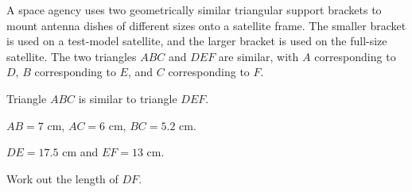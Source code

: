 \begin{question}
\noindent A space agency uses two geometrically similar triangular support brackets to mount antenna dishes of different sizes onto a satellite frame. The smaller bracket is used on a test-model satellite, and the larger bracket is used on the full-size satellite. The two triangles $ABC$ and $DEF$ are similar, with $A$ corresponding to $D$, $B$ corresponding to $E$, and $C$ corresponding to $F$.

\begin{center}
\end{center}

\noindent Triangle $ABC$ is similar to triangle $DEF$.

\noindent $AB = 7$ cm, $AC = 6$ cm, $BC = 5.2$ cm.

\noindent $DE = 17.5$ cm and $EF = 13$ cm.

\noindent Work out the length of $DF$.

\vspace{5cm}

\begin{flushright}
\end{flushright}
\end{question}
